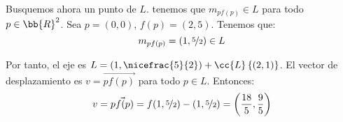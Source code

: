 \begin{ejercicio}
\begin{enumerate}
        Busquemos ahora un punto de $L$. tenemos que $m_{pf(p)}\in L$ para todo $p\in \bb{R}^2$. Sea $p=(0,0)$, $f(p)=(2,5)$. Tenemos que:
        \begin{equation*}
            m_{pf(p)} = \left(1,\nicefrac{5}{2}\right)\in L
        \end{equation*}

        Por tanto, el eje es $L=(1,\nicefrac{5}{2}) + \cc{L}\left\{\left(2,1\right)\right\}$. El vector de desplazamiento es $v=\vec{pf(p)}$ para todo $p\in L$. Entonces:
        \begin{equation*}
            v = \vec{pf(p)} = f(1,\nicefrac{5}{2}) - (1,\nicefrac{5}{2})
            = \left(\frac{18}{5}, \frac{9}{5}\right)
        \end{equation*}
    \end{enumerate}
\end{ejercicio}

